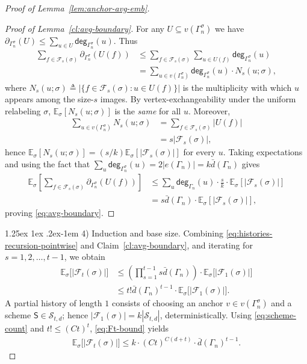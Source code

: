 \documentclass[10pt,a4paper]{amsart}
\makeatletter
\renewcommand{\paragraph}{%
  \@startsection{paragraph}{4}%
  {\z@}{1.25ex \@plus 1ex \@minus .2ex}{-1em}%
  {\normalfont\normalsize\bfseries}%
}
\newcommand{\s}[1]{\mathsf{#1}}
\makeatother
\begin{document}
\begin{proof}[Proof of Lemma~\ref{lem:anchor-avg-emb}]
\begin{proof}[Proof of Lemma~\ref{cl:avg-boundary}]
For any $U\subseteq v(\Gamma_n^\sigma)$ we have $\partial_{\Gamma_n^\sigma}(U)\le\sum_{u\in U}\s{deg}_{\Gamma_n^\sigma}(u)$.
Thus
\begin{align}
\sum_{f\in\mathcal F_s(\sigma)} \partial_{\Gamma_n^\sigma}(U(f))
&\leq \sum_{f\in\mathcal F_s(\sigma)} \sum_{u\in U(f)} \s{deg}_{\Gamma_n^\sigma}(u)\\
&=\sum_{u\in v(\Gamma_n^\sigma)} \s{deg}_{\Gamma_n^\sigma}(u)\cdot N_s(u;\sigma),
\end{align}
where $N_s(u;\sigma)\triangleq|\{  f\in\mathcal F_s(\sigma): u\in U(f)  \}|$ is the multiplicity with which $u$ appears among the size-$s$ images.
By vertex-exchangeability under the uniform relabeling $\sigma$, $\mathbb E_\sigma[N_s(u;\sigma)]$ is the \emph{same} for all $u$.
Moreover,
\begin{align}
\sum_{u\in v(\Gamma_n^\sigma)} N_s(u;\sigma)&=\sum_{f\in\mathcal F_s(\sigma)} |U(f)|\\
&=s  |\mathcal F_s(\sigma)|,
\end{align}
hence $\mathbb E_\sigma[N_s(u;\sigma)]=(s/k)  \mathbb E_\sigma[|\mathcal F_s(\sigma)|]$ for every $u$. Taking expectations and using the fact that $\sum_{u}\s{deg}_{\Gamma_n^\sigma}(u)=2|e(\Gamma_n)|=k  \bar{d}(\Gamma_n)$ gives
\begin{align}
\mathbb E_\sigma\left[\sum_{f\in\mathcal F_s(\sigma)} \partial_{\Gamma_n^\sigma}(U(f))\right]
&\leq\sum_{u} \s{deg}_{\Gamma_n}(u)\cdot \frac{s}{k} \cdot \mathbb E_\sigma[  |\mathcal F_s(\sigma)|  ]\\
&=s  \bar{d}(\Gamma_n)\cdot\mathbb E_\sigma[  |\mathcal F_s(\sigma)|  ],
\end{align}
proving \eqref{eq:avg-boundary}.
\end{proof}

\paragraph{4) Induction and base size.}
Combining \eqref{eq:histories-recursion-pointwise} and Claim~\ref{cl:avg-boundary}, and iterating for $s=1,2,\dots,t-1$, we obtain
\begin{align}\label{eq:Ft-bound}
\mathbb E_\sigma\big[  |\mathcal F_t(\sigma)|  \big]
&\leq
\left(\prod_{s=1}^{t-1} s  \bar{d}(\Gamma_n)\right)\cdot \mathbb E_\sigma\big[  |\mathcal F_1(\sigma)|  \big]\\
&\leq t!  \bar{d}(\Gamma_n)^{  t-1}\cdot \mathbb E_\sigma\big[  |\mathcal F_1(\sigma)|  \big].
\end{align}
A partial history of length $1$ consists of choosing an anchor $v\in v(\Gamma_n^\sigma)$ and a scheme $\mathsf S\in\mathcal S_{t,d}$; hence $|\mathcal F_1(\sigma)|=k  |\mathcal S_{t,d}|$, deterministically.
Using \eqref{eq:scheme-count} and $t!\le (Ct)^t$, \eqref{eq:Ft-bound} yields
\begin{align}
\mathbb E_\sigma\big[  |\mathcal F_t(\sigma)|  \big]
\leq
k\cdot (Ct)^{  C(d+t)}\cdot \bar{d}(\Gamma_n)^{  t-1}.
\end{align}


\end{proof}
\end{document}
